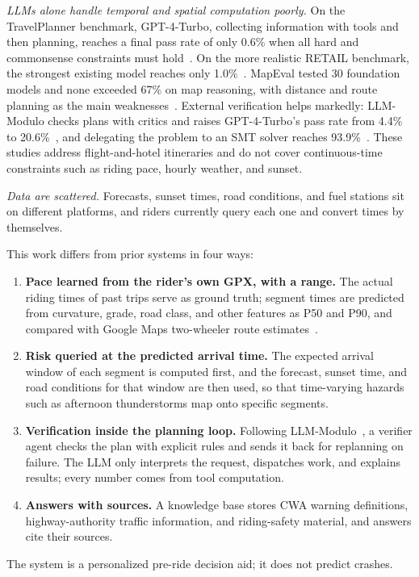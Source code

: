 \textit{LLMs alone handle temporal and spatial computation poorly.} On the TravelPlanner benchmark, GPT-4-Turbo, collecting information with tools and then planning, reaches a final pass rate of only 0.6\% when all hard and commonsense constraints must hold~\cite{xie2024travelplanner}. On the more realistic RETAIL benchmark, the strongest existing model reaches only 1.0\%~\cite{deng2025retail}. MapEval tested 30 foundation models and none exceeded 67\% on map reasoning, with distance and route planning as the main weaknesses~\cite{dihan2025mapeval}. External verification helps markedly: LLM-Modulo checks plans with critics and raises GPT-4-Turbo's pass rate from 4.4\% to 20.6\%~\cite{gundawar2024llmmodulo}, and delegating the problem to an SMT solver reaches 93.9\%~\cite{hao2025smt}. These studies address flight-and-hotel itineraries and do not cover continuous-time constraints such as riding pace, hourly weather, and sunset.

\textit{Data are scattered.} Forecasts, sunset times, road conditions, and fuel stations sit on different platforms, and riders currently query each one and convert times by themselves.

This work differs from prior systems in four ways:
\begin{enumerate}
  \item \textbf{Pace learned from the rider's own GPX, with a range.} The actual riding times of past trips serve as ground truth; segment times are predicted from curvature, grade, road class, and other features as P50 and P90, and compared with Google Maps two-wheeler route estimates~\cite{googleroutes2026}.
  \item \textbf{Risk queried at the predicted arrival time.} The expected arrival window of each segment is computed first, and the forecast, sunset time, and road conditions for that window are then used, so that time-varying hazards such as afternoon thunderstorms map onto specific segments.
  \item \textbf{Verification inside the planning loop.} Following LLM-Modulo~\cite{gundawar2024llmmodulo}, a verifier agent checks the plan with explicit rules and sends it back for replanning on failure. The LLM only interprets the request, dispatches work, and explains results; every number comes from tool computation.
  \item \textbf{Answers with sources.} A knowledge base stores CWA warning definitions, highway-authority traffic information, and riding-safety material, and answers cite their sources.
\end{enumerate}
The system is a personalized pre-ride decision aid; it does not predict crashes.

